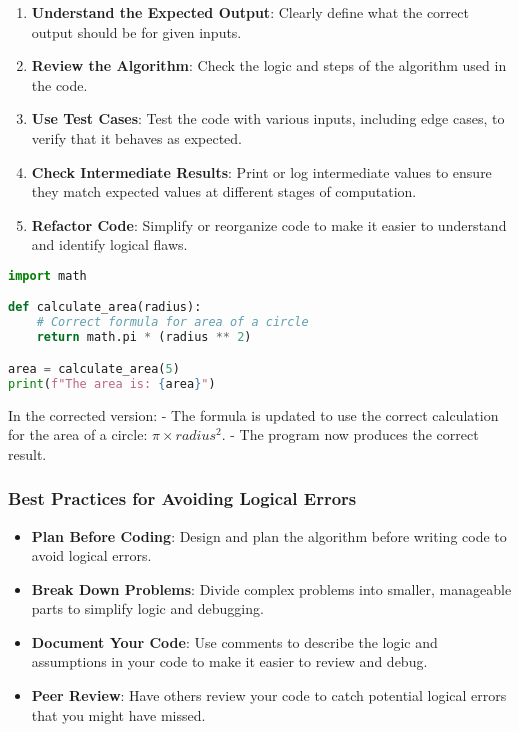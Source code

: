 \begin{enumerate}
    \item \textbf{Understand the Expected Output}: Clearly define what the correct output should be for given inputs.
    \item \textbf{Review the Algorithm}: Check the logic and steps of the algorithm used in the code.
    \item \textbf{Use Test Cases}: Test the code with various inputs, including edge cases, to verify that it behaves as expected.
    \item \textbf{Check Intermediate Results}: Print or log intermediate values to ensure they match expected values at different stages of computation.
    \item \textbf{Refactor Code}: Simplify or reorganize code to make it easier to understand and identify logical flaws.
\end{enumerate}

\begin{lstlisting}[language=Python, caption=Improved Version of the Logical Error Example]
import math

def calculate_area(radius):
    # Correct formula for area of a circle
    return math.pi * (radius ** 2)

area = calculate_area(5)
print(f"The area is: {area}")
\end{lstlisting}

In the corrected version:
- The formula is updated to use the correct calculation for the area of a circle: \( \pi \times radius^2 \).
- The program now produces the correct result.

\subsubsection{Best Practices for Avoiding Logical Errors}

\begin{itemize}
    \item \textbf{Plan Before Coding}: Design and plan the algorithm before writing code to avoid logical errors.
    \item \textbf{Break Down Problems}: Divide complex problems into smaller, manageable parts to simplify logic and debugging.
    \item \textbf{Document Your Code}: Use comments to describe the logic and assumptions in your code to make it easier to review and debug.
    \item \textbf{Peer Review}: Have others review your code to catch potential logical errors that you might have missed.
\end{itemize}


